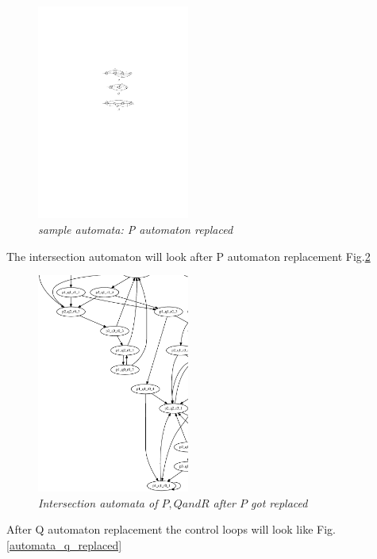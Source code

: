 \begin{figure}
\begin{center}
\includegraphics[width=50mm]{graph_after_p_replacement.pdf}
\end{center}
\caption{{\em sample automata: P automaton replaced}}
\label{automata_p_replaced}
\end{figure}


The intersection automaton will look after P automaton replacement Fig.\ref{graph_p_replaced}

\begin{figure}
\begin{center}
\includegraphics[width=50mm]{graph_p_replaced.pdf}
\end{center}
\caption{{\em Intersection automata of $P, Q and R$ after $P$ got replaced}}
\label{graph_p_replaced}
\end{figure}

After Q automaton replacement the control loops will look like Fig. \ref{automata_q_replaced}

